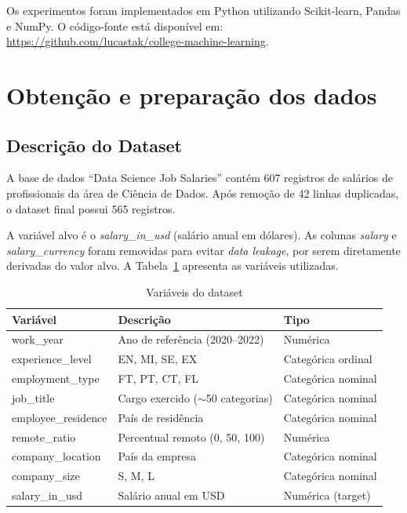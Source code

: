 \documentclass[12pt]{article}
\begin{document}
Os experimentos foram implementados em Python utilizando Scikit-learn, Pandas e NumPy. O código-fonte está disponível em: \url{https://github.com/lucastak/college-machine-learning}.


\section{Obtenção e preparação dos dados}

\subsection{Descrição do Dataset}

A base de dados ``Data Science Job Salaries'' \cite{ds_salary_dataset} contém 607 registros de salários de profissionais da área de Ciência de Dados. Após remoção de 42 linhas duplicadas, o dataset final possui 565 registros.

A variável alvo é o \textit{salary\_in\_usd} (salário anual em dólares). As colunas \textit{salary} e \textit{salary\_currency} foram removidas para evitar \textit{data leakage}, por serem diretamente derivadas do valor alvo. A Tabela~\ref{tab:variaveis} apresenta as variáveis utilizadas.

\begin{table}[H]
\centering
\caption{Variáveis do dataset}
\label{tab:variaveis}
\begin{tabular}{|l|l|l|}
\hline
\textbf{Variável} & \textbf{Descrição} & \textbf{Tipo} \\ \hline
work\_year & Ano de referência (2020--2022) & Numérica \\ \hline
experience\_level & EN, MI, SE, EX & Categórica ordinal \\ \hline
employment\_type & FT, PT, CT, FL & Categórica nominal \\ \hline
job\_title & Cargo exercido ($\sim$50 categorias) & Categórica nominal \\ \hline
employee\_residence & País de residência & Categórica nominal \\ \hline
remote\_ratio & Percentual remoto (0, 50, 100) & Numérica \\ \hline
company\_location & País da empresa & Categórica nominal \\ \hline
company\_size & S, M, L & Categórica nominal \\ \hline
salary\_in\_usd & Salário anual em USD & Numérica (target) \\ \hline
\end{tabular}
\end{table}
\end{document}
